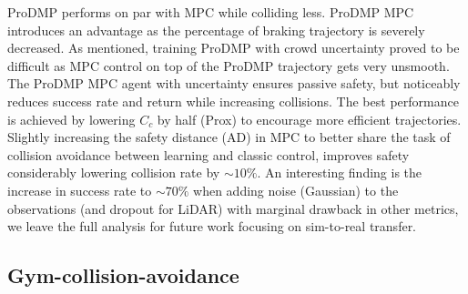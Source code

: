 \documentclass[letterpaper,conference,10pt]{IEEEconf}
\begin{document}
ProDMP performs on par with MPC while colliding less. ProDMP MPC introduces an advantage as the percentage of braking trajectory is severely decreased. As mentioned, training ProDMP with crowd uncertainty proved to be difficult as MPC control on top of the ProDMP trajectory gets very unsmooth. The ProDMP MPC agent with uncertainty ensures passive safety, but noticeably reduces success rate and return while increasing collisions. The best performance is achieved by lowering $C_c$ by half (Prox) to encourage more efficient trajectories. Slightly increasing the safety distance (AD) in MPC to better share the task of collision avoidance between learning and classic control, improves safety considerably lowering collision rate by $\sim10\%$. An interesting finding is the increase in success rate to $ \sim 70\%$ when adding noise (Gaussian) to the observations (and dropout for LiDAR) with marginal drawback in other metrics, we leave the full analysis for future work focusing on sim-to-real transfer.


\subsection{Gym-collision-avoidance}
\end{document}
